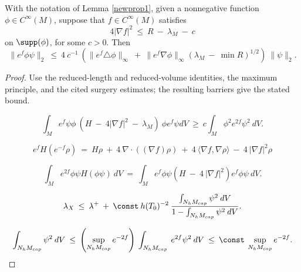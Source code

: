 \begin{lemma}
  \label{lem:kl-alternative-proof-cusp-incompressibility-positivity-entropy}
 \label{newprop2}
With the notation of Lemma \ref{newprop1},
given a nonnegative function $\phi \in C^\infty(M)$,
suppose that $f \in C^\infty(M)$ satisfies
\begin{equation}
4 |\nabla f|^2 \: \le \: R \: - \: \lambda_M \: - \: c
\end{equation}
on $\supp(\phi)$, for some $c > 0$. Then
\begin{equation} \label{eig3}
\|e^f \phi \psi\|_2 \: \le \: 4 \: c^{-1} \: \left( \|e^f \triangle \phi\|_\infty
\: + \: \|e^f \nabla \phi\|_\infty (\lambda_M \: - \: \min R)^{1/2} \right)
\: \|\psi\|_2.
\end{equation}
\end{lemma}

\begin{proof}
\sketch Use the reduced-length and reduced-volume identities, the maximum principle, and the cited surgery estimates; the resulting barriers give the stated bound.

\begin{equation} \label{part1}
\int_M e^f \psi\phi \: (H \: - \: 4 |\nabla f|^2 \: - \: \lambda_M) \: \phi
e^f \psi dV \: \ge \: c \int_M \phi^2 e^{2f} \psi^2 \: dV.
\end{equation}

\begin{equation} \label{Hf}
e^f H (e^{-f} \rho) \: = \: H \rho \: + \: 4 \: \nabla \cdot
((\nabla f) \rho) \: + \: 4 \: \langle \nabla f, \nabla \rho \rangle
\: - \: 4 \: |\nabla f|^2 \rho
\end{equation}

\begin{equation} \label{part2}
\int_M e^{2f} \phi \psi H(\phi \psi) \: dV \: = \:
\int_M e^f \phi \psi (H \: - \: 4 \:
|\nabla f|^2)  e^{f} \phi \psi \: dV.
\end{equation}

\begin{equation} \label{bound11}
\lambda_X \: \le \: \lambda^+ \: + \: \const \: h(T_0)^{-2} \:
\frac{\int_{N_h M_{cap}} \psi^2 \: dV}{1 - \int_{N_h M_{cap}} \psi^2 \: dV}.
\end{equation}

\begin{equation} \label{bound12}
\int_{N_h M_{cap}} \psi^2 \: dV \: \le \:
\left( \sup_{N_h M_{cap}} e^{-2f} \right) \:
\int_{N_h M_{cap}} \: e^{2f} \psi^2 \: dV \: \le \:
\const \: \sup_{N_h M_{cap}} e^{-2f}.
\end{equation}
\end{proof}


